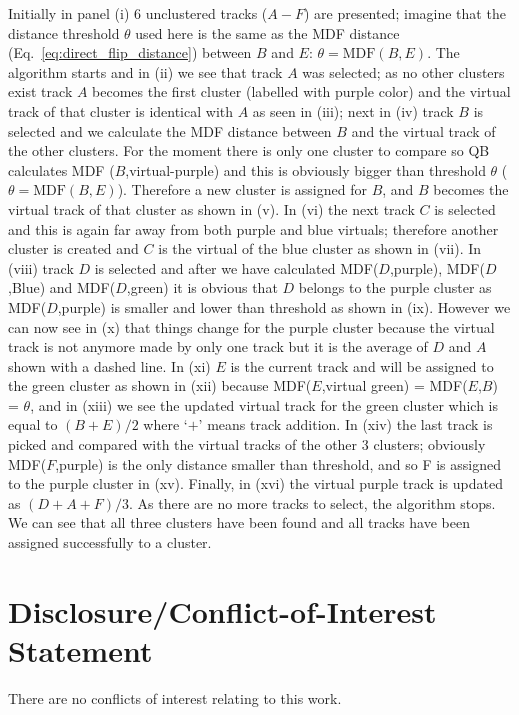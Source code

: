 \documentclass{bioinfo}
\begin{document}
\noindent
Initially in panel (i) 6 unclustered tracks ($A-F$) are presented; imagine
that the distance threshold $\theta$ used here is the same as the MDF
distance (Eq.~\ref{eq:direct_flip_distance}) between $B$ and $E$: $\theta =
\mathrm{MDF}(B,E)$. The algorithm starts and in (ii) we see that track $A$ was
selected; as no other clusters exist track $A$ becomes the first cluster
(labelled with purple color) and the virtual track of that cluster is
identical with $A$ as seen in (iii); next in (iv) track $B$ is selected and
we calculate the MDF distance between $B$ and the virtual track of the
other clusters. For the moment there is only one cluster to compare so
QB calculates MDF ($B$,virtual-purple) and this is obviously bigger than
threshold $\theta$ ($\theta = \mathrm{MDF}(B,E)$).  Therefore a new cluster is
assigned for $B$, and $B$ becomes the virtual track of that cluster as shown
in (v). In (vi) the next track $C$ is selected and this is again far away
from both purple and blue virtuals; therefore another cluster is created
and $C$ is the virtual of the blue cluster as shown in (vii).  In (viii)
track $D$ is selected and after we have calculated MDF($D$,purple),
MDF($D$,Blue) and MDF($D$,green) it is obvious that $D$ belongs to the purple
cluster as MDF($D$,purple) is smaller and lower than threshold as shown in
(ix).  However we can now see in (x) that things change for the purple
cluster because the virtual track is not anymore made by only one track
but it is the average of $D$ and $A$ shown with a dashed line. In (xi) $E$ is
the current track and will be assigned to the green cluster as shown in
(xii) because MDF($E$,virtual green) = MDF($E$,$B$) = $\theta$, and in (xiii)
we see the updated virtual track for the green cluster which is equal to
$(B+E)/2$ where `$+$' means track addition. In (xiv) the last track is picked
and compared with the virtual tracks of the other 3 clusters; obviously
MDF($F$,purple) is the only distance smaller than threshold, and so F is
assigned to the purple cluster in (xv).  Finally, in (xvi) the virtual
purple track is updated as $(D+A+F)/3$. As there are no more tracks to
select, the algorithm stops. We can see that all three clusters have
been found and all tracks have been assigned successfully to a cluster.


\section*{Disclosure/Conflict-of-Interest Statement}
There are no conflicts of interest relating to this work.

%

%
%
%

\end{document}
